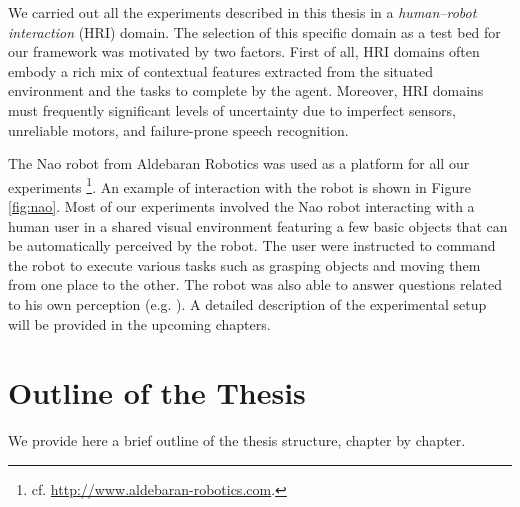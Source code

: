 We carried out all the experiments described in this thesis in a \textit{human--robot interaction}  (HRI) domain.  The selection of this specific domain as a test bed for our framework was motivated by two factors.  First of all, HRI domains often embody a rich mix of contextual features extracted from the situated environment and the tasks to complete by the agent. Moreover, HRI domains must frequently significant levels of uncertainty due to imperfect sensors, unreliable motors, and failure-prone speech recognition. 

The Nao robot from Aldebaran Robotics was used as a platform for all our experiments \footnote{cf.  \url{http://www.aldebaran-robotics.com}.}.  An example of interaction with the robot is shown in Figure \ref{fig:nao}.  Most of our experiments involved the Nao robot interacting with a human user in a shared visual environment featuring a few basic objects that can be automatically perceived by the robot.  The user were instructed to command the robot to execute various tasks such as grasping objects and moving them from one place to the other.  The robot was also able to answer questions related to his own perception (e.g. ).  A detailed description of the experimental setup will be provided in the upcoming chapters. 

\section{Outline of the Thesis}

We provide here a brief outline of the thesis structure, chapter by chapter. 


